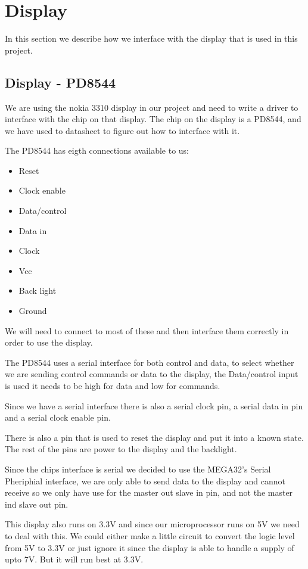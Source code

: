 \section{Display}

In this section we describe how we interface with the display that is used in this project. 

\subsection{Display - PD8544}

We are using the nokia 3310 display in our project and need to write a driver to interface with the chip on that display.
The chip on the display is a PD8544, and we have used to datasheet\cite{philips:pcd8544} to figure out how to interface with it. 

The PD8544 has eigth connections available to us:
\begin{itemize}
\item Reset
\item Clock enable
\item Data/control
\item Data in
\item Clock
\item Vcc
\item Back light
\item Ground
\end{itemize}

We will need to connect to most of these and then interface them correctly in order to use the display.

The PD8544 uses a serial interface for both control and data, to select whether we are sending control commands or data to the display,
the Data/control input is used it needs to be high for data and low for commands.

Since we have a serial interface there is also a serial clock pin, a serial data in pin and a serial clock enable pin.

There is also a pin that is used to reset the display and put it into a known state. The rest of the pins are power to the display and the backlight.

Since the chips interface is serial we decided to use the MEGA32's Serial Pheriphial interface, we are only able to send data to the display 
and cannot receive so we only have use for the master out slave in pin, and not the master ind slave out pin.

This display also runs on 3.3V and since our microprocessor runs on 5V we need to deal with this. We could either make a little circuit to convert the 
logic level from 5V to 3.3V or just ignore it since the display is able to handle a supply of upto 7V. But it will run best at 3.3V.

